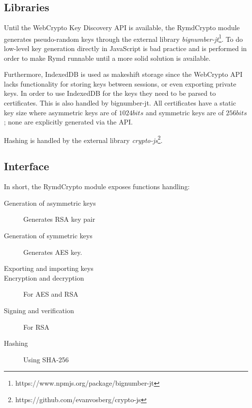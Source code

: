 \subsection{Libraries}
Until the WebCrypto Key Discovery API is available, the RymdCrypto module generates pseudo-random keys through the external library \emph{bignumber-jt}\footnote{https://www.npmjs.org/package/bignumber-jt}. To do low-level key generation directly in JavaScript is bad practice and is performed in order to make Rymd runnable until a more solid solution is available.

Furthermore, IndexedDB is used as makeshift storage since the WebCrypto API lacks functionality for storing keys between sessions, or even exporting private keys. In order to use IndexedDB for the keys they need to be parsed to certificates. This is also handled by bignumber-jt. All certificates have a static key size where asymmetric keys are of $1024bits$ and symmetric keys are of $256bits$; none are explicitly generated via the API.

Hashing is handled by the external library \emph{crypto-js}\footnote{https://github.com/evanvosberg/crypto-js}.

\subsection{Interface}

In short, the RymdCrypto module exposes functions handling:
\begin{description}
  \item[Generation of asymmetric keys] Generates RSA key pair
  \item[Generation of symmetric keys] Generates AES key.
  \item[Exporting and importing keys]
  \item[Encryption and decryption] For AES and RSA
  \item[Signing and verification] For RSA
  \item[Hashing] Using SHA-256
\end{description}


